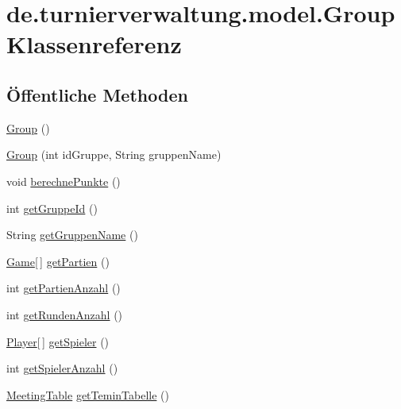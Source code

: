 \hypertarget{classde_1_1turnierverwaltung_1_1model_1_1_group}{}\section{de.\+turnierverwaltung.\+model.\+Group Klassenreferenz}
\label{classde_1_1turnierverwaltung_1_1model_1_1_group}
\subsection*{Öffentliche Methoden}
\begin{DoxyCompactItemize}
\item 
\hyperlink{classde_1_1turnierverwaltung_1_1model_1_1_group_ace69e67777f2963fde4431d0f188e957}{Group} ()
\item 
\hyperlink{classde_1_1turnierverwaltung_1_1model_1_1_group_af686b6130cea80d11d08de18c1374505}{Group} (int id\+Gruppe, String gruppen\+Name)
\item 
void \hyperlink{classde_1_1turnierverwaltung_1_1model_1_1_group_a69763df76a60ea2274599c490ea76129}{berechne\+Punkte} ()
\item 
int \hyperlink{classde_1_1turnierverwaltung_1_1model_1_1_group_a5f7aa22135f9b1fe0ec80be2027408c5}{get\+Gruppe\+Id} ()
\item 
String \hyperlink{classde_1_1turnierverwaltung_1_1model_1_1_group_a8f3f5ef300434332ee2542c9d4bb5938}{get\+Gruppen\+Name} ()
\item 
\hyperlink{classde_1_1turnierverwaltung_1_1model_1_1_game}{Game}\mbox{[}$\,$\mbox{]} \hyperlink{classde_1_1turnierverwaltung_1_1model_1_1_group_a96438a5e9883038081f5f3ae7d86e56a}{get\+Partien} ()
\item 
int \hyperlink{classde_1_1turnierverwaltung_1_1model_1_1_group_a6cbbcfd06c7752373ce596b1a7d161c8}{get\+Partien\+Anzahl} ()
\item 
int \hyperlink{classde_1_1turnierverwaltung_1_1model_1_1_group_aeed2f0edf8d4a4c6f65b3f735fb87347}{get\+Runden\+Anzahl} ()
\item 
\hyperlink{classde_1_1turnierverwaltung_1_1model_1_1_player}{Player}\mbox{[}$\,$\mbox{]} \hyperlink{classde_1_1turnierverwaltung_1_1model_1_1_group_aa7d1c5b13ea9956ed33890c3a332464f}{get\+Spieler} ()
\item 
int \hyperlink{classde_1_1turnierverwaltung_1_1model_1_1_group_ae0c5ad0ebe528b32ea54fb1d464d5f59}{get\+Spieler\+Anzahl} ()
\item 
\hyperlink{classde_1_1turnierverwaltung_1_1model_1_1_meeting_table}{Meeting\+Table} \hyperlink{classde_1_1turnierverwaltung_1_1model_1_1_group_a8cc66a89c604dbadc1854c1198522bb6}{get\+Temin\+Tabelle} ()

\end{DoxyCompactItemize}
